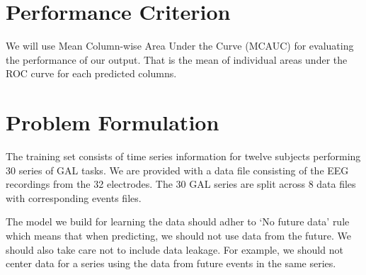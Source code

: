 \documentclass[]{article}
\begin{document}
\section{Performance Criterion}
We will use Mean Column-wise Area Under the Curve (MCAUC) for evaluating the performance of our output.  That is the mean of individual areas under the ROC curve for each predicted columns.

\section{Problem Formulation}
The training set consists of time series information for twelve subjects performing 30 series of GAL tasks.  We are provided with a data file consisting of the EEG recordings from the 32 electrodes.  The 30 GAL series are split across 8 data files with corresponding events files.

The model we build for learning the data should adher to `No future data' rule\cite{kaggledata} which means that when predicting, we should not use data from the future.  We should also take care not to include data leakage.  For example, we should not center data for a series using the data from future events in the same series.
\end{document}
